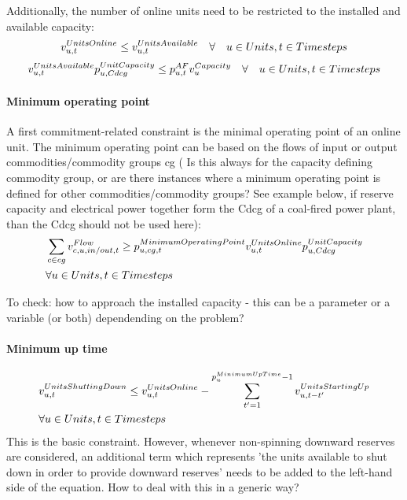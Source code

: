 Additionally, the number of online units need to be restricted to the installed and available capacity:
\begin{equation} \label{eq:maximumonlineunits}
\vUnitsOnline \le \vUnitsAvailable \quad \forall \quad \units, \timesteps
\end{equation}
\begin{equation} \label{eq:availableunits}
\vUnitsAvailable \pUnitCapacity \le \pAF \vCapacity \quad \forall \quad \units, \timesteps
\end{equation}

\paragraph{Minimum operating point}
A first commitment-related constraint is the minimal operating point of an online unit. The minimum operating point can be based on the flows of input or output commodities/commodity groups cg ({\color{red}
Is this always for the capacity defining commodity group, or are there instances where a minimum operating point is defined for other commodities/commodity groups?} See example below, if reserve capacity and electrical power together form the Cdcg of a coal-fired power plant, than the Cdcg should not be used here):
\begin{align} \label{eq:minimumoperatingpoint}
&\sum_{\commodity \in cg} \vFlow \ge \pMinimumOperatingPoint \vUnitsOnline \pUnitCapacity \nonumber \\
& \forall \units, \timesteps
\end{align}

{\color{red} To check: how to approach the installed capacity - this can be a parameter or a variable (or both) dependending on the problem?}


\paragraph{Minimum up time}
\begin{align} \label{eq:minimumuptime}
&\vUnitsShuttingDown \le \vUnitsOnline - \sum_{\timestep'=1}^{\pMinimumUpTime - 1} \vUnitsStartingUp[\unit,\timestep-\timestep'] \nonumber \\
& \forall \units, \timesteps
\end{align}
{\color{red} This is the basic constraint. However, whenever non-spinning downward reserves are considered, an additional term which represents 'the units available to shut down in order to provide downward reserves' needs to be added to the left-hand side of the equation. How to deal with this in a generic way?}

